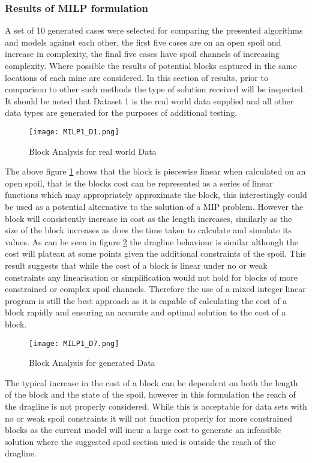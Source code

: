 \subsubsection{Results of MILP formulation}
A set of 10 generated cases were selected for comparing the presented algorithms and models against each other, the first five cases are on an open spoil and increase in complexity, the final five cases have spoil channels of increasing complexity. Where possible the results of potential blocks captured in the same locations of each mine are considered. In this section of results, prior to comparison to other such methods the type of solution received will be inspected.	It should be noted that Dataset 1 is the real world data supplied and all other data types are generated for the purposes of additional testing. 
\begin{figure}[h]
\label{MIP1-1}
\caption{Block Analysis for real world Data}
\texttt{[image: MILP1\_D1.png]}
\end{figure}
The above figure \ref{MIP1-1} shows that the block is piecewise linear when calculated on an open spoil, that is the blocks cost can be represented as a series of linear functions which may appropriately approximate the block, this interestingly could be used as a potential alternative to the solution of a MIP problem. However the block will consistently increase in cost as the length increases, similarly as the size of the block increases as does the time taken to calculate and simulate its values. As can be seen in  figure \ref{MIP1-7} the dragline behaviour is similar although the cost will plateau at some points given the additional constraints of the spoil. This result suggests that while the cost of a block is linear under no or weak constraints any linearisation or simplification would not hold for blocks of more constrained or complex spoil channels. Therefore the use of a mixed integer linear program is still the best approach as it is capable of calculating the cost of a block rapidly and ensuring an accurate and optimal solution to the cost of a block. 

\begin{figure}[h!]
\label{MIP1-7}
\caption{Block Analysis for generated Data}
\texttt{[image: MILP1\_D7.png]}
\end{figure}
The typical increase in the cost of a block can be dependent on both the length of the block and the state of the spoil, however in this formulation the reach of the dragline is not properly considered. While this is acceptable for data sets with no or weak spoil constraints it will not function properly for more constrained blocks as the current model will incur a large cost to generate an infeasible solution where the suggested spoil section used is outside the reach of the dragline. 
